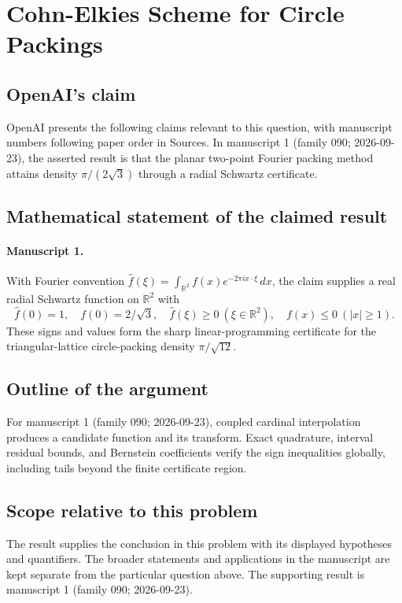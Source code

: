 \documentclass[11pt]{article}
\begin{document}
\section*{Cohn-Elkies Scheme for Circle Packings}

\subsection{OpenAI's claim}
OpenAI presents the following claims relevant to this question, with manuscript numbers following paper order in Sources. In manuscript 1 (family 090; 2026-09-23), the asserted result is that the planar two-point Fourier packing method attains density $\pi/(2\sqrt3)$ through a radial Schwartz certificate.

\subsection{Mathematical statement of the claimed result}
\paragraph{Manuscript 1.}
With Fourier convention $\widehat f(\xi)=\int_{\mathbb R^2}f(x)e^{-2\pi i x\cdot\xi}\,dx$, the claim supplies a real radial Schwartz function on $\mathbb R^2$ with
\[
 \widehat f(0)=1,\quad f(0)=2/\sqrt3,\quad
 \widehat f(\xi)\ge0\ (\xi\in\mathbb R^2),\quad f(x)\le0\ (|x|\ge1).
\]
These signs and values form the sharp linear-programming certificate for the triangular-lattice circle-packing density $\pi/\sqrt{12}$.

\subsection{Outline of the argument}
For manuscript 1 (family 090; 2026-09-23), coupled cardinal interpolation produces a candidate function and its transform. Exact quadrature, interval residual bounds, and Bernstein coefficients verify the sign inequalities globally, including tails beyond the finite certificate region.

\subsection{Scope relative to this problem}
The result supplies the conclusion in this problem with its displayed hypotheses and quantifiers. The broader statements and applications in the manuscript are kept separate from the particular question above. The supporting result is manuscript 1 (family 090; 2026-09-23).
\end{document}
